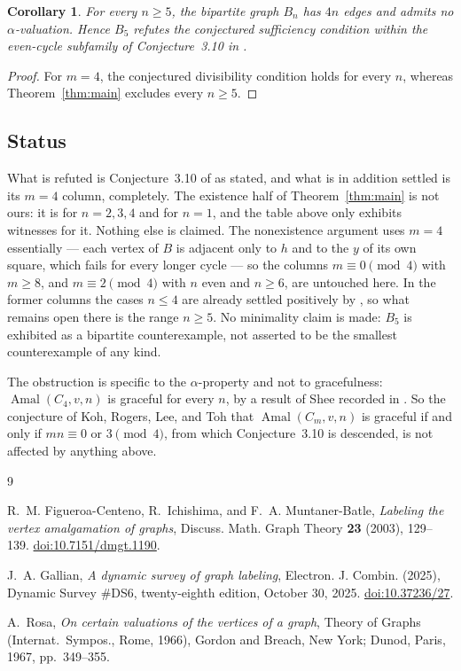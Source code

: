 \documentclass[11pt]{amsart}
\newtheorem{corollary}[theorem]{Corollary}
\DeclareMathOperator{\Amal}{Amal}
\begin{document}
\begin{corollary}\label{cor:counterexample}
For every $n\ge5$, the bipartite graph $B_n$ has $4n$ edges and admits no
$\alpha$-valuation. Hence $B_5$ refutes the conjectured sufficiency
condition within the even-cycle subfamily of Conjecture~3.10 in
\cite{FCIM}.
\end{corollary}

\begin{proof}
For $m=4$, the conjectured divisibility condition holds for every $n$,
whereas Theorem~\ref{thm:main} excludes every $n\ge5$.
\end{proof}

\subsection*{Status}

What is refuted is Conjecture~3.10 of \cite{FCIM} as stated, and what is
in addition settled is its $m=4$ column, completely. The existence half
of Theorem~\ref{thm:main} is not ours: it is \cite[Theorem~3.8]{FCIM} for
$n=2,3,4$ and \cite{Rosa} for $n=1$, and the table above only exhibits
witnesses for it. Nothing else is claimed. The nonexistence argument uses
$m=4$ essentially --- each vertex of $B$ is adjacent only to $h$ and to
the $y$ of its own square, which fails for every longer cycle --- so the
columns $m\equiv0\pmod4$ with $m\ge8$, and $m\equiv2\pmod4$ with $n$ even
and $n\ge6$, are untouched here. In the former columns the cases $n\le4$
are already settled positively by \cite[Theorem~3.8]{FCIM}, so what
remains open there is the range $n\ge5$. No minimality claim is
made: $B_5$ is exhibited as a bipartite counterexample, not asserted to be
the smallest counterexample of any kind.

The obstruction is specific to the $\alpha$-property and not to
gracefulness: $\Amal(C_4,v,n)$ is graceful for every $n$, by a result of
Shee recorded in \cite[p.~19]{Gallian}. So the conjecture of Koh, Rogers,
Lee, and Toh that $\Amal(C_m,v,n)$ is graceful if and only if
$mn\equiv0$ or $3\pmod4$, from which Conjecture~3.10 is descended, is not
affected by anything above.

\begingroup
\small
\raggedright
\begin{thebibliography}{9}

R.~M. Figueroa-Centeno, R.~Ichishima, and F.~A. Muntaner-Batle,
\emph{Labeling the vertex amalgamation of graphs},
Discuss. Math. Graph Theory \textbf{23} (2003), 129--139.
\href{https://doi.org/10.7151/dmgt.1190}{doi:10.7151/dmgt.1190}.

J.~A. Gallian,
\emph{A dynamic survey of graph labeling},
Electron. J. Combin. (2025), Dynamic Survey \#DS6,
twenty-eighth edition, October 30, 2025.
\href{https://doi.org/10.37236/27}{doi:10.37236/27}.

A.~Rosa,
\emph{On certain valuations of the vertices of a graph},
Theory of Graphs (Internat.\ Sympos., Rome, 1966),
Gordon and Breach, New York; Dunod, Paris, 1967, pp.~349--355.

\end{thebibliography}
\endgroup
\end{document}
